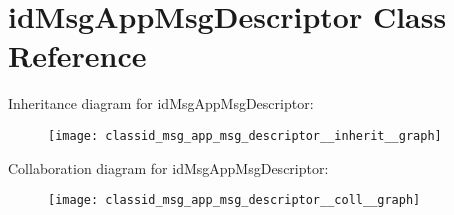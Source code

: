\hypertarget{classid_msg_app_msg_descriptor}{}\section{id\+Msg\+App\+Msg\+Descriptor Class Reference}
\label{classid_msg_app_msg_descriptor}


Inheritance diagram for id\+Msg\+App\+Msg\+Descriptor\+:\nopagebreak
\begin{figure}[H]
\begin{center}
\leavevmode
\texttt{[image: classid\_msg\_app\_msg\_descriptor\_\_inherit\_\_graph]}
\end{center}
\end{figure}


Collaboration diagram for id\+Msg\+App\+Msg\+Descriptor\+:\nopagebreak
\begin{figure}[H]
\begin{center}
\leavevmode
\texttt{[image: classid\_msg\_app\_msg\_descriptor\_\_coll\_\_graph]}
\end{center}
\end{figure}
